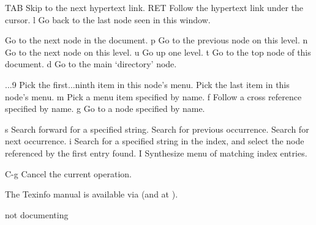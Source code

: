 \infokey TAB         Skip to the next hypertext link.\cr
\infokey RET         Follow the hypertext link under the cursor.\cr
\infokey l           Go back to the last node seen in this window.\cr

           Go to the next node in the document.\cr
\infokey p           Go to the previous node on this level.\cr
\infokey n           Go to the next node on this level.\cr
\infokey u           Go up one level.\cr
\infokey t           Go to the top node of this document.\cr
\infokey d           Go to the main `directory' node.\cr

...9       Pick the first...ninth item in this node's menu.\cr
{}           Pick the last item in this node's menu.\cr
\infokey m           Pick a menu item specified by name.\cr
\infokey f           Follow a cross reference specified by name.\cr
\infokey g           Go to a node specified by name.\cr

\infokey s           Search forward for a specified string.\cr
\infokey \lbracechar{}           Search for previous occurrence.\cr
\infokey \rbracechar{}           Search for next occurrence.\cr
\infokey i           Search for a specified string in the index, and\cr
\infokey {}              select the node referenced by the first entry found.\cr
\infokey I           Synthesize menu of matching index entries.\cr

\infokey C-g         Cancel the current operation.\cr
\endinfokeys

The Texinfo manual is available via \linebreak
(and at ).

\copyrightnotice
\bye

not documenting

